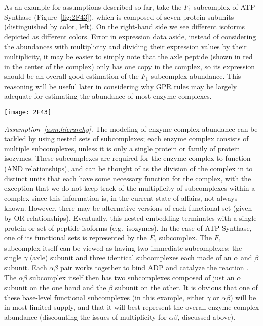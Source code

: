 As an example for assumptions described so far, take the $F_1$
subcomplex of ATP Synthase (Figure~\ref{fig:2F43}), which is composed
of seven protein subunits (distinguished by color, left). On the
right-hand side we see different isoforms depicted as different
colors.  Error in expression data aside, instead of considering the
abundances with multiplicity and dividing their expression values by
their multiplicity, it may be easier to simply note that the axle
peptide (shown in red in the center of the complex) only has one copy
in the complex, so its expression should be an overall good estimation
of the $F_1$ subcomplex abundance. This reasoning will be useful
later in considering why GPR rules may be largely adequate for estimating
the abundance of most enzyme complexes.

\begin{figure*}%
\centering
\texttt{[image: 2F43]}
\caption{Illustration of the $F_1$ part of the ATP Synthase complex
  (PDB ID 1E79; \citealt{Gibbons2000,Bernstein1978,Gezelter}).
  This illustration demonstrates both how an enzyme complex may be
  constituted by multiple subunits (left), and how some of those
  subunits may be products of the same gene and have differing
  stoichiometries within the complex (right).}
\label{fig:2F43}
\end{figure*}

\emph{Assumption~\ref{asm:hierarchy}.}
The modeling of enzyme complex abundance can be tackled by using
nested sets of subcomplexes; each enzyme complex consists of multiple
subcomplexes, unless it is only a single protein or family of protein
isozymes.  These subcomplexes are required for the enzyme complex to
function (AND relationships), and can be thought of as the division of
the complex in to distinct units that each have some necessary
function for the complex, with the exception that we do not keep track
of the multiplicity of subcomplexes within a complex since this
information is, in the current state of affairs, not always known.
However, there may be alternative versions of each functional set
(given by OR relationships). Eventually, this nested embedding
terminates with a single protein or set of peptide isoforms
(e.g.\ isozymes).  In the case of ATP Synthase, one of its functional
sets is represented by the $F_1$ subcomplex. The $F_1$ subcomplex
itself can be viewed as having two immediate subcomplexes: the single
$\gamma$ (axle) subunit and three identical subcomplexes each made of
an $\alpha$ and $\beta$ subunit. Each $\alpha\beta$ pair works
together to bind ADP and catalyze the reaction \citep{Oster2003}. The
$\alpha\beta$ subcomplex itself then has two subcomplexes composed of
just an $\alpha$ subunit on the one hand and the $\beta$ subunit on
the other.  It is obvious that one of these base-level functional
subcomplexes (in this example, either $\gamma$ or $\alpha\beta$) will
be in most limited supply, and that it will best represent the overall
enzyme complex abundance (discounting the issues of multiplicity for
$\alpha\beta$, discussed above).

